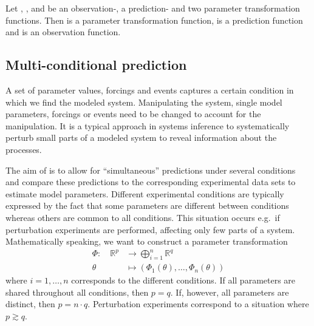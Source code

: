 \documentclass[article]{jss}
\begin{document}
Let , ,  and  be an observation-, a prediction- and two parameter transformation functions. Then  is a parameter transformation function,  is a prediction function and  is an observation function.

\subsection{Multi-conditional prediction}

A set of parameter values, forcings and events captures a certain condition in which we find the modeled system. Manipulating the system, single model parameters, forcings or events need to be changed to account for the manipulation. It is a typical approach in systems inference to systematically perturb small parts of a modeled system to reveal information about the processes.

The aim of  is to allow for ``simultaneous'' predictions under several conditions and compare these predictions to the corresponding experimental data sets to estimate model parameters.
Different experimental conditions are typically expressed by the fact that some parameters are different between conditions whereas others are common to all conditions. This situation occurs e.g.~if perturbation experiments are performed, affecting only few parts of a system.
Mathematically speaking, we want to construct a parameter transformation
\begin{equation}
	\begin{aligned}
		\Phi:\quad \mathbb R^p & \longrightarrow  \bigoplus_{i = 1}^n \mathbb R^q \\
		\theta & \longmapsto  \left(\Phi_1(\theta), \dots, \Phi_n(\theta)\right)
	\end{aligned}
	\label{eq:partrafo}
\end{equation}
where $i = 1, \dots, n$ corresponds to the different conditions. If all parameters are shared throughout all conditions, then $p = q$. If, however, all parameters are distinct, then $p = n\cdot q$. Perturbation experiments correspond to a situation where $p\gtrsim q$.
\end{document}
